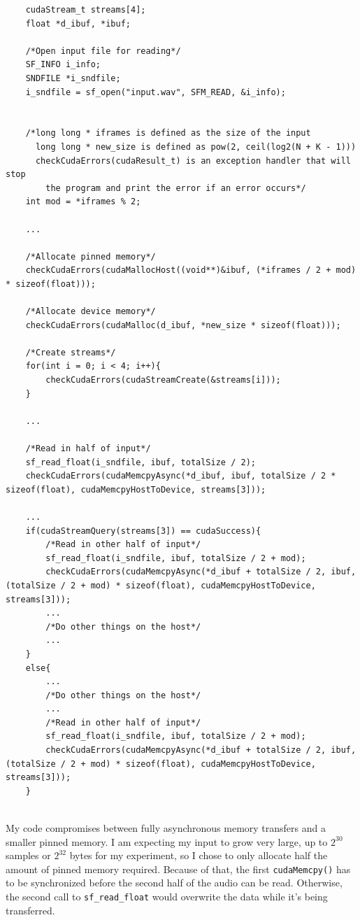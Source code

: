 \begin{verbatim}
    cudaStream_t streams[4];
    float *d_ibuf, *ibuf;
    
    /*Open input file for reading*/
    SF_INFO i_info;
    SNDFILE *i_sndfile;
    i_sndfile = sf_open("input.wav", SFM_READ, &i_info);
	
	
    /*long long * iframes is defined as the size of the input
      long long * new_size is defined as pow(2, ceil(log2(N + K - 1)))
      checkCudaErrors(cudaResult_t) is an exception handler that will stop
        the program and print the error if an error occurs*/
    int mod = *iframes % 2;
    
    ...
    
    /*Allocate pinned memory*/
    checkCudaErrors(cudaMallocHost((void**)&ibuf, (*iframes / 2 + mod) * sizeof(float)));

    /*Allocate device memory*/
    checkCudaErrors(cudaMalloc(d_ibuf, *new_size * sizeof(float)));
    
    /*Create streams*/
    for(int i = 0; i < 4; i++){
        checkCudaErrors(cudaStreamCreate(&streams[i]));
	}
    
    ...
    
	/*Read in half of input*/
	sf_read_float(i_sndfile, ibuf, totalSize / 2);
	checkCudaErrors(cudaMemcpyAsync(*d_ibuf, ibuf, totalSize / 2 * sizeof(float), cudaMemcpyHostToDevice, streams[3]));

	...
	if(cudaStreamQuery(streams[3]) == cudaSuccess){
	    /*Read in other half of input*/
	    sf_read_float(i_sndfile, ibuf, totalSize / 2 + mod);
	    checkCudaErrors(cudaMemcpyAsync(*d_ibuf + totalSize / 2, ibuf, (totalSize / 2 + mod) * sizeof(float), cudaMemcpyHostToDevice, streams[3]));
	    ...
	    /*Do other things on the host*/
        ...
	}
	else{
	    ...
	    /*Do other things on the host*/
	    ...
	    /*Read in other half of input*/
	    sf_read_float(i_sndfile, ibuf, totalSize / 2 + mod);
	    checkCudaErrors(cudaMemcpyAsync(*d_ibuf + totalSize / 2, ibuf, (totalSize / 2 + mod) * sizeof(float), cudaMemcpyHostToDevice, streams[3]));
	}
	
\end{verbatim}

My code compromises between fully asynchronous memory transfers and a smaller pinned memory. I am expecting my input to grow very large, up to $2^{30}$ samples or $2^{32}$ bytes for my experiment, so I chose to only allocate half the amount of pinned memory required. Because of that, the first \verb|cudaMemcpy()| has to be synchronized before the second half of the audio can be read. Otherwise, the second call to \verb|sf_read_float| would overwrite the data while it's being transferred.


